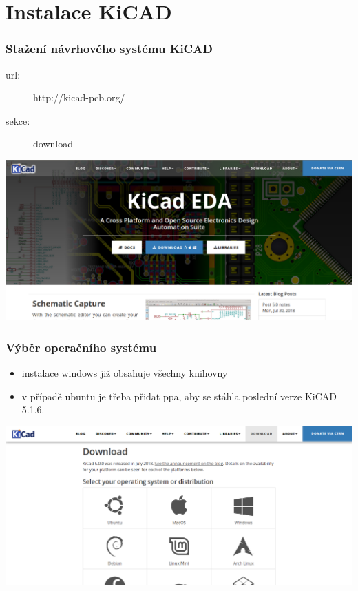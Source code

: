 \documentclass{beamer}
\newcommand{\kicadVersion}{5.1.6.}
\begin{document}
\section{\texorpdfstring{Instalace KiCAD}{Instalace Kicad}}
	\begin{frame}
    \frametitle{Stažení návrhového systému KiCAD}
		
		\begin{description}
			\item[url:] http://kicad-pcb.org/
			\item[sekce:] download
		\end{description}
		
		\begin{center}
			\includegraphics[scale=0.3]{obr/kicad_url.png}
		\end{center}
	\end{frame}
	\begin{frame}
    \frametitle{Výběr operačního systému}
		\small
		\begin{itemize}
			\item instalace windows již obsahuje všechny knihovny
			\item v případě ubuntu je třeba přidat ppa, aby se stáhla poslední verze KiCAD \kicadVersion\
		\end{itemize}
		
		\begin{center}
			\includegraphics[scale=0.3]{obr/kicad_dwnld.png}
		\end{center}
	\end{frame}
\end{document}
